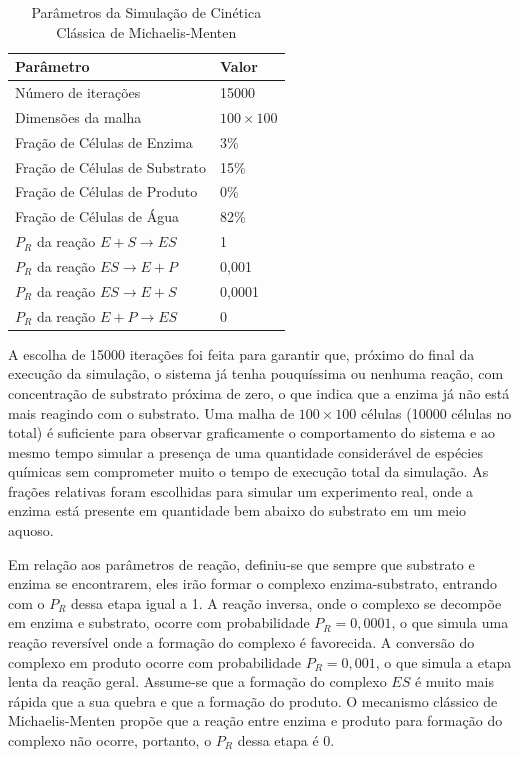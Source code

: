 \documentclass[12pt,oneside]{report}
\begin{document}
\begin{table}[H]
    \centering
    \caption{Parâmetros da Simulação de Cinética Clássica de Michaelis-Menten}
    \vspace{0.2cm}
    \begin{tabularx}{\textwidth}{X m{5cm}}
        \hline
        \textbf{Parâmetro}                     & \textbf{Valor}   \\
        \hline
        Número de iterações                    & 15000            \\
        Dimensões da malha                     & $100 \times 100$ \\
        Fração de Células de Enzima            & 3\%              \\
        Fração de Células de Substrato         & 15\%             \\
        Fração de Células de Produto           & 0\%              \\
        Fração de Células de Água              & 82\%             \\
        $P_R$ da reação $E + S \rightarrow ES$ & 1                \\
        $P_R$ da reação $ES \rightarrow E + P$ & 0{,}001          \\
        $P_R$ da reação $ES \rightarrow E + S$ & 0{,}0001         \\
        $P_R$ da reação $E + P \rightarrow ES$ & 0                \\
        \hline
    \end{tabularx}
    \vspace{0.2cm}
    \label{tab:params_michaelis_menten}
\end{table}

A escolha de 15000 iterações foi feita para garantir que, próximo do final da execução da simulação, o sistema já tenha pouquíssima ou nenhuma reação, com concentração de substrato próxima de zero, o que indica que a enzima já não está mais reagindo com o substrato. Uma malha de $100 \times 100$ células (10000 células no total) é suficiente para observar graficamente o comportamento do sistema e ao mesmo tempo simular a presença de uma quantidade considerável de espécies químicas sem comprometer muito o tempo de execução total da simulação. As frações relativas foram escolhidas para simular um experimento real, onde a enzima está presente em quantidade bem abaixo do substrato em um meio aquoso.

Em relação aos parâmetros de reação, definiu-se que sempre que substrato e enzima se encontrarem, eles irão formar o complexo enzima-substrato, entrando com o $P_R$ dessa etapa igual a 1. A reação inversa, onde o complexo se decompõe em enzima e substrato, ocorre com probabilidade $P_R = 0{,}0001$, o que simula uma reação reversível onde a formação do complexo é favorecida. A conversão do complexo em produto ocorre com probabilidade $P_R = 0{,}001$, o que simula a etapa lenta da reação geral. Assume-se que a formação do complexo $ES$ é muito mais rápida que a sua quebra e que a formação do produto. O mecanismo clássico de Michaelis-Menten propõe que a reação entre enzima e produto para formação do complexo não ocorre, portanto, o $P_R$ dessa etapa é 0.
\end{document}
